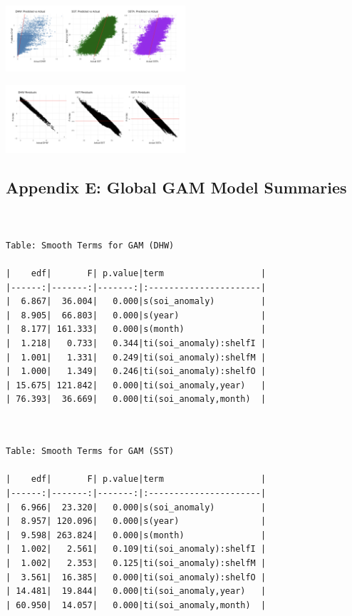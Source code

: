 \documentclass[letterpaper,9pt,twocolumn,twoside,]{pinp}
\begin{document}
\begin{center}
\includegraphics[width=0.5\textwidth]{report_images/rf_predicted_vs_actual.png}
\end{center}

\begin{center}
\includegraphics[width=0.5\textwidth]{report_images/rf_residuals.png}
\end{center}

\subsection{Appendix E: Global GAM Model
Summaries}\label{appendix-e-global-gam-model-summaries}

\begin{ShadedResult}
\begin{verbatim}


Table: Smooth Terms for GAM (DHW)

|    edf|       F| p.value|term                   |
|------:|-------:|-------:|:----------------------|
|  6.867|  36.004|   0.000|s(soi_anomaly)         |
|  8.905|  66.803|   0.000|s(year)                |
|  8.177| 161.333|   0.000|s(month)               |
|  1.218|   0.733|   0.344|ti(soi_anomaly):shelfI |
|  1.001|   1.331|   0.249|ti(soi_anomaly):shelfM |
|  1.000|   1.349|   0.246|ti(soi_anomaly):shelfO |
| 15.675| 121.842|   0.000|ti(soi_anomaly,year)   |
| 76.393|  36.669|   0.000|ti(soi_anomaly,month)  |

\end{verbatim}
\end{ShadedResult}

\begin{ShadedResult}
\begin{verbatim}


Table: Smooth Terms for GAM (SST)

|    edf|       F| p.value|term                   |
|------:|-------:|-------:|:----------------------|
|  6.966|  23.320|   0.000|s(soi_anomaly)         |
|  8.957| 120.096|   0.000|s(year)                |
|  9.598| 263.824|   0.000|s(month)               |
|  1.002|   2.561|   0.109|ti(soi_anomaly):shelfI |
|  1.002|   2.353|   0.125|ti(soi_anomaly):shelfM |
|  3.561|  16.385|   0.000|ti(soi_anomaly):shelfO |
| 14.481|  19.844|   0.000|ti(soi_anomaly,year)   |
| 60.950|  14.057|   0.000|ti(soi_anomaly,month)  |

\end{verbatim}
\end{ShadedResult}
\end{document}

